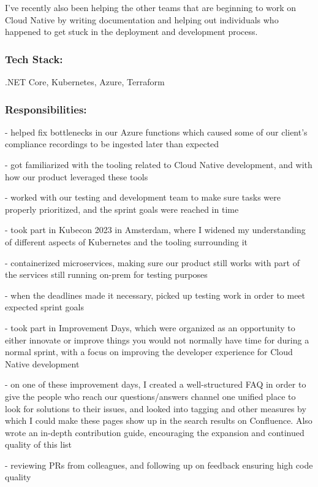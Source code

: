 \documentclass[a4paper,hidelinks,11pt]{article}
\begin{document}
I’ve recently also been helping the other teams that are beginning to work on Cloud Native by
writing documentation and helping out individuals who happened to get stuck in the deployment
and development process.

\subsubsection{Tech Stack:} .NET Core, Kubernetes, Azure, Terraform
\subsubsection{Responsibilities:}

- helped fix bottlenecks in our Azure functions which caused some of our client’s compliance
recordings to be ingested later than expected

- got familiarized with the tooling related to Cloud Native development, and with how our
product leveraged these tools

- worked with our testing and development team to make sure tasks were properly prioritized,
and the sprint goals were reached in time

- took part in Kubecon 2023 in Amsterdam, where I widened my understanding of different
aspects of Kubernetes and the tooling surrounding it

- containerized microservices, making sure our product still works with part of the services still
running on-prem for testing purposes

- when the deadlines made it necessary, picked up testing work in order to meet expected sprint
goals

- took part in Improvement Days, which were organized as an opportunity to either innovate
or improve things you would not normally have time for during a normal sprint, with a focus
on improving the developer experience for Cloud Native development

- on one of these improvement days, I created a well-structured FAQ in order to give the people
who reach our questions/answers channel one unified place to look for solutions to their issues,
and looked into tagging and other measures by which I could make these pages show up in
the search results on Confluence. Also wrote an in-depth contribution guide, encouraging the
expansion and continued quality of this list

- reviewing PRs from colleagues, and following up on feedback ensuring high code quality
\end{document}
